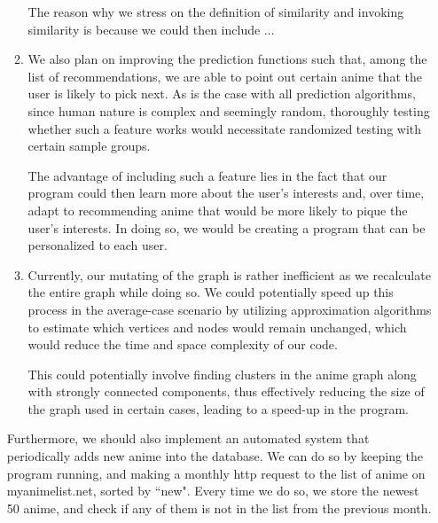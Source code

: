 \documentclass[12pt]{article}
\begin{document}
\begin{enumerate}
\begin{text}
\begin{enumerate}
    The reason why we stress on the definition of similarity and invoking similarity is because we could then include ...
    \item We also plan on improving the prediction functions such that, among the list of recommendations, we are able to point out certain anime that the user is likely to pick next. As is the case with all prediction algorithms, since human nature is complex and seemingly random, thoroughly testing whether such a feature works would necessitate randomized testing with certain sample groups.
    
    The advantage of including such a feature lies in the fact that our program could then learn more about the user's interests and, over time, adapt to recommending anime that would be more likely to pique the user's interests. In doing so, we would be creating a program that can be personalized to each user.
    \item Currently, our mutating of the graph is rather inefficient as we recalculate the entire graph while doing so. We could potentially speed up this process in the average-case scenario by utilizing approximation algorithms to estimate which vertices and nodes would remain unchanged, which would reduce the time and space complexity of our code.
    
    This could potentially involve finding clusters in the anime graph along with strongly connected components, thus effectively reducing the size of the graph used in certain cases, leading to a speed-up in the program.
\end{enumerate}

Furthermore, we should also implement an automated system that periodically adds new anime into the database. We can do so by keeping the program running, and making a monthly http request to the list of anime on myanimelist.net, sorted by ``new". Every time we do so, we store the newest 50 anime, and check if any of them is not in the list from the previous month.
\end{text}


\maketitle

\newpage




\end{enumerate}
\end{document}

